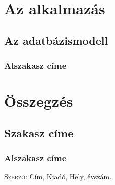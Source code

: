 \documentclass[centeredchapter]{thesis-ekf}
\theoremstyle{definition}
\theoremstyle{remark}
\begin{document}
\chapter{Az alkalmazás}

\section{Az adatbázismodell}

\subsection{Alszakasz címe}

\chapter{Összegzés}

\section{Szakasz címe}

\subsection{Alszakasz címe}


\begin{thebibliography}{1}
 \textsc{Szerző}: Cím, Kiadó, Hely, évszám.
\end{thebibliography}
\end{document}
